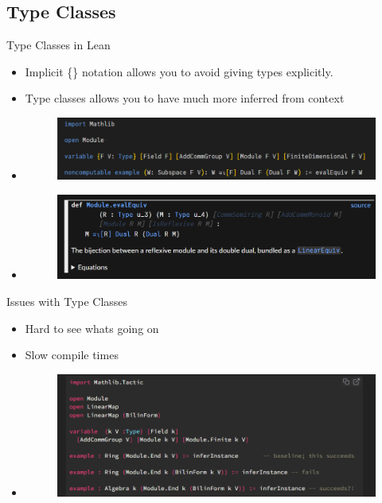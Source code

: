 \documentclass[svgnames]{beamer}
\begin{document}
\subsection{Type Classes}
\begin{frame}{Type Classes in Lean}
\begin{itemize}[<+->]
    \item Implicit \{\} notation allows you to avoid giving types explicitly.
    \item Type classes allows you to have much more inferred from context
    \item 
\begin{figure}
    \centering
    \includegraphics[width=0.75\linewidth]{image4.png}
\end{figure}
    \item \begin{figure} \centering \includegraphics[width=0.75\linewidth]{image5.png}\end{figure}
\end{itemize}
\end{frame}

\begin{frame}{Issues with Type Classes}
\begin{itemize}[<+->]
    \item Hard to see whats going on
    \item Slow compile times
    \item \begin{figure}
    \centering
    \includegraphics[width=1\linewidth]{image6.png}
\end{figure}
\end{itemize}
\end{frame}
\end{document}
